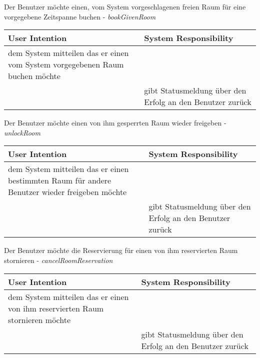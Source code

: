 \begin{table}[h]
	Der Benutzer möchte einen, vom System vorgeschlagenen freien Raum für eine vorgegebene Zeitspanne buchen - \textit{bookGivenRoom}\\
	\begin{tabularx}{\textwidth}{|X|X|}
	\rowcolor{heading} \textbf{User Intention} & \textbf{System Responsibility}\\ \hline
	dem System mitteilen das er einen vom System vorgegebenen Raum buchen möchte & \\
	 & gibt Statusmeldung über den Erfolg an den Benutzer zurück \\ \hline
	\end{tabularx}
	
	Der Benutzer möchte einen von ihm gesperrten Raum wieder freigeben - \textit{unlockRoom}\\
	\begin{tabularx}{\textwidth}{|X|X|}
	\rowcolor{heading} \textbf{User Intention} & \textbf{System Responsibility}\\ \hline
	dem System mitteilen das er einen bestimmten Raum für andere Benutzer wieder freigeben möchte & \\
	 & gibt Statusmeldung über den Erfolg an den Benutzer zurück \\ \hline
	\end{tabularx}
	
	Der Benutzer möchte die Reservierung für einen von ihm reservierten Raum stornieren - \textit{cancelRoomReservation}\\
	\begin{tabularx}{\textwidth}{|X|X|}
	\rowcolor{heading} \textbf{User Intention} & \textbf{System Responsibility}\\ \hline
	dem System mitteilen das er einen von ihm reservierten Raum stornieren möchte & \\
	 & gibt Statusmeldung über den Erfolg an den Benutzer zurück \\ \hline
	\end{tabularx}
\end{table}
\clearpage
